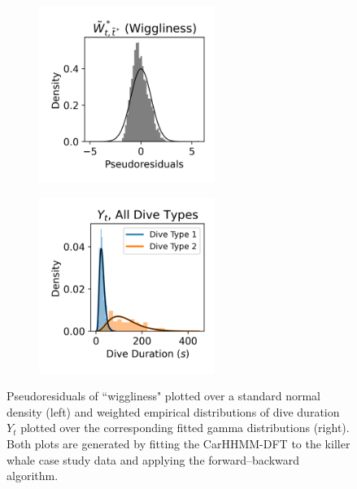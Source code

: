 \begin{figure}[ht]
    \begin{subfigure}{0.45\textwidth}
    	\centering
    	\includegraphics[width=2.25in]{../Plots/2019/20190902-182840-CATs_OB_1_0_267_CarHHMM2_pseudresids_ahat.png}
    \end{subfigure}
    \begin{subfigure}{0.45\textwidth}
    	\centering
    	\includegraphics[width=2.25in]{../Plots/2019/20190902-182840-CATs_OB_1_0_267_CarHHMM2_empirical_hist_dive_duration.png}
    \end{subfigure}
    \caption{Pseudoresiduals of ``wiggliness"
    plotted over a standard normal density (left) and weighted empirical distributions of dive duration $Y_t$ plotted over the corresponding fitted gamma distributions (right). Both plots are generated by fitting the CarHHMM-DFT to the killer whale case study data and applying the forward--backward algorithm.}
    \label{fig:model_checking}
\end{figure}


